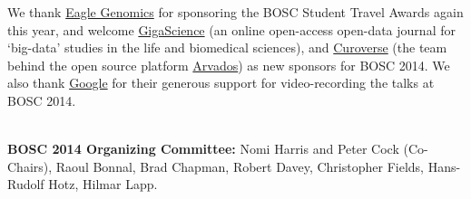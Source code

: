 \documentclass[10pt,oneside]{article}
\begin{document}
\noindent
We thank \href{http://www.eaglegenomics.com}{Eagle Genomics} for
sponsoring the BOSC Student Travel Awards again this year, and welcome 
\href{http://www.gigasciencejournal.com/}{GigaScience} (an online
open-access open-data journal for `big-data' studies in the life and
biomedical sciences), and \href{https://curoverse.com/}{Curoverse}
(the team behind the open source platform \href{http://arvados.org/}{Arvados})
as new sponsors for BOSC 2014. We also thank
\href{https://developers.google.com/open-source/}{Google}
for their generous support for video-recording the talks at BOSC 2014.

~\\ \noindent %
\textbf{BOSC 2014 Organizing Committee:}
Nomi Harris and Peter Cock (Co-Chairs), Raoul Bonnal, Brad Chapman, Robert Davey, Christopher Fields, Hans-Rudolf Hotz, Hilmar Lapp.
\end{document}
